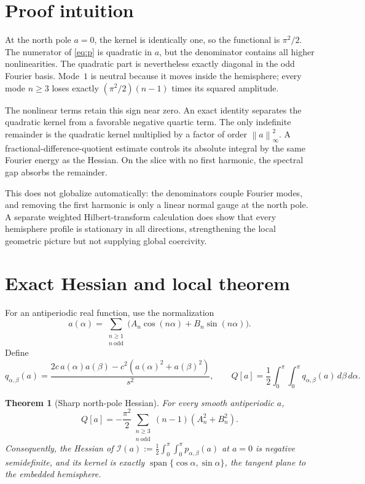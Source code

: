 \documentclass[11pt]{article}
\newtheorem{theorem}{Theorem}
\newcommand{\I}{\mathcal I}
\newcommand{\norm}[1]{\left\lVert#1\right\rVert}
\begin{document}
\section{Proof intuition}

At the north pole $a=0$, the kernel is identically one, so the functional is
$\pi^2/2$.  The numerator of \eqref{eq:p} is quadratic in $a$, but the denominator contains all higher nonlinearities.  The quadratic part is nevertheless exactly diagonal in the odd Fourier basis.  Mode~$1$ is neutral because it moves inside the hemisphere; every mode $n\ge3$ loses exactly $(\pi^2/2)(n-1)$ times its squared amplitude.

The nonlinear terms retain this sign near zero.  An exact identity separates the quadratic kernel from a favorable negative quartic term.  The only indefinite remainder is the quadratic kernel multiplied by a factor of order $\norm a_\infty^2$.  A fractional-difference-quotient estimate controls its absolute integral by the same Fourier energy as the Hessian.  On the slice with no first harmonic, the spectral gap absorbs the remainder.

This does not globalize automatically: the denominators couple Fourier modes, and removing the first harmonic is only a linear normal gauge at the north pole.  A separate weighted Hilbert-transform calculation does show that every hemisphere profile is stationary in all directions, strengthening the local geometric picture but not supplying global coercivity.

\section{Exact Hessian and local theorem}

For an antiperiodic real function, use the normalization
\begin{equation}\label{eq:fourier}
 a(\alpha)=\sum_{\substack{n\ge1\\n\ \mathrm{odd}}}
 \bigl(A_n\cos(n\alpha)+B_n\sin(n\alpha)\bigr).
\end{equation}
Define
\begin{equation}\label{eq:q}
 q_{\alpha,\beta}(a)=
 \frac{2c\,a(\alpha)a(\beta)-c^2(a(\alpha)^2+a(\beta)^2)}{s^2},
 \qquad
 Q[a]=\frac12\int_0^\pi\int_0^\pi q_{\alpha,\beta}(a)\,d\beta\,d\alpha.
\end{equation}

\begin{theorem}[Sharp north-pole Hessian]\label{thm:hessian}
For every smooth antiperiodic $a$,
\begin{equation}\label{eq:spectrum}
 Q[a]= -\frac{\pi^2}{2}
 \sum_{\substack{n\ge3\\n\ \mathrm{odd}}}(n-1)(A_n^2+B_n^2).
\end{equation}
Consequently, the Hessian of $\I(a):=\frac12\int_0^\pi\int_0^\pi p_{\alpha,\beta}(a)$ at $a=0$ is negative semidefinite, and its kernel is exactly $\operatorname{span}\{\cos\alpha,\sin\alpha\}$, the tangent plane to the embedded hemisphere.
\end{theorem}
\end{document}
